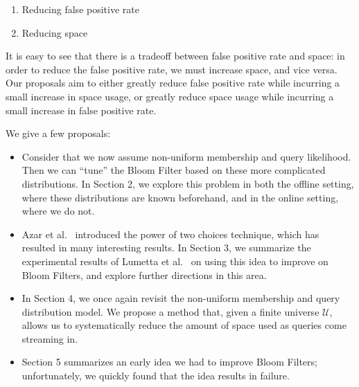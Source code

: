 \documentclass[../main-paper.tex]{subfiles}
\begin{document}
\begin{enumerate}
\item Reducing false positive rate
\item Reducing space
\end{enumerate}

It is easy to see that there is a tradeoff between false positive rate and space: in order to reduce the false positive rate, we must increase space, and vice versa. Our proposals aim to either greatly reduce false positive rate while incurring a small increase in space usage, or greatly reduce space usage while incurring a small increase in false positive rate.

We give a few proposals:
\begin{itemize}
\item Consider that we now assume non-uniform membership and query likelihood. Then we can ``tune'' the Bloom Filter based on these more complicated distributions. In Section 2, we explore this problem in both the offline setting, where these distributions are known beforehand, and in the online setting, where we do not.
\item Azar et al.~\cite{Azar:1999:BA:330358.330366} introduced the power of two choices technique, which has resulted in many interesting results. In Section 3, we summarize the experimental results of Lumetta et al.~\cite{lumetta2007} on using this idea to improve on Bloom Filters, and explore further directions in this area.
\item In Section 4, we once again revisit the non-uniform membership and query distribution model. We propose a method that, given a finite universe $\mathcal{U}$, allows us to systematically reduce the amount of space used as queries come streaming in.
\item Section 5 summarizes an early idea we had to improve Bloom Filters; unfortunately, we quickly found that the idea results in failure.
\end{itemize}
\end{document}
